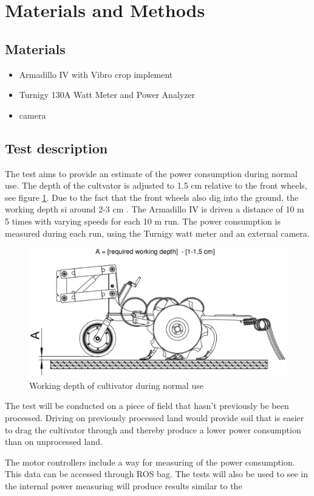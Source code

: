 \section{Materials and Methods}
\subsection{Materials}\label{Materials}
\begin{itemize}
	\item Armadillo IV with Vibro crop implement
	\item Turnigy 130A Watt Meter and Power Analyzer
	\item camera
\end{itemize}
\subsection{Test description}
The test aims to provide an estimate of the power consumption during normal use. The depth of the cultvator is adjusted to 1.5 cm relative to the front wheels, see figure \ref{fig:vibro_crop_working_depth}. Due to the fact that the front wheels also dig into the ground, the working depth si around 2-3 cm \cite{vibro_crop}. The Armadillo IV is driven a distance of 10 m 5 times with varying speeds for each 10 m run. The power consumption is measured during each run, using the Turnigy watt meter and an external camera.  
\begin{figure}[hbtp]
	\centering
	\includegraphics[width=0.7\linewidth]{./images/vibro_crop_working_depth}
	\caption{Working depth of cultivator during normal use \cite{vibro_crop}}
	\label{fig:vibro_crop_working_depth}
\end{figure}
 
The test will be conducted on a piece of field that hasn't previously be been processed. Driving on previously processed land would provide soil that is easier to drag the cultivator through and thereby produce a lower power consumption than on unprocessed land. 

The motor controllers include a way for measuring of the power consumption. This data can be accessed through ROS bag. The tests will also be used to see in the internal power measuring will produce results similar to the 
